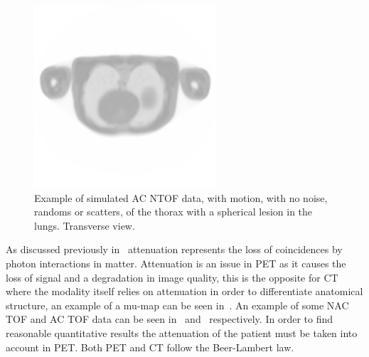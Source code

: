                 \begin{figure}
                    \centering
                    
                    \includegraphics[width=1.0\linewidth]{figures/background_ac_example.png}
                    
                    \captionsetup{singlelinecheck=false, justification=raggedright}
                    \caption{Example of simulated \gls{AC} \gls{NTOF} data, with motion, with no noise, randoms or scatters, of the thorax with a spherical lesion in the lungs. Transverse view.} \label{fig:combined_pet_ct_ac_tof_example}
                \end{figure}
                
                As discussed previously in~ attenuation represents the loss of coincidences by photon interactions in matter. Attenuation is an issue in \gls{PET} as it causes the loss of signal and a degradation in image quality, this is the opposite for \gls{CT} where the modality itself relies on attenuation in order to differentiate anatomical structure, an example of a \gls{mu-map} can be seen in~. An example of some \gls{NAC} \gls{TOF} and \gls{AC} \gls{TOF} data can be seen in~ and~ respectively. In order to find reasonable quantitative results the attenuation of the patient must be taken into account in \gls{PET}. Both \gls{PET} and \gls{CT} follow the Beer-Lambert law.
                
